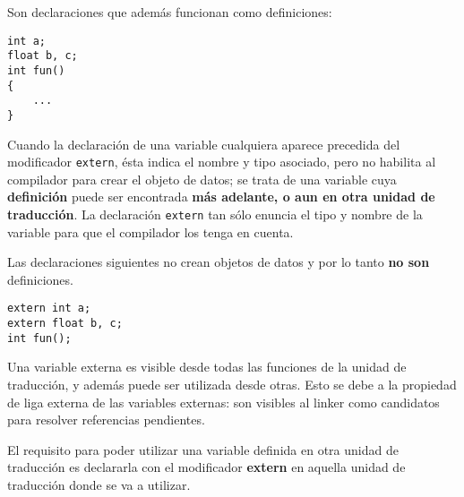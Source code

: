 \begin{ejemplo}
Son declaraciones que además funcionan como definiciones:
\begin{lstlisting}
int a;
float b, c;
int fun() 
{
	...
}
\end{lstlisting}
\end{ejemplo}


Cuando la declaración de una variable cualquiera aparece precedida del modificador \lstinline{extern}, ésta indica el nombre y tipo asociado, pero no habilita al compilador para crear el objeto de datos; se trata de una variable cuya \textbf{definición} puede ser encontrada
\textbf{más adelante, o aun en otra unidad de traducción}. La declaración \lstinline{extern} tan sólo enuncia el tipo y nombre de la variable para que el compilador los tenga en cuenta.

\begin{ejemplo}
Las declaraciones siguientes no crean objetos de datos y por lo tanto \textbf{no son} definiciones.
\begin{lstlisting}
extern int a;
extern float b, c;
int fun();
\end{lstlisting}
\end{ejemplo}

Una variable externa es visible desde todas las funciones de la unidad de traducción, y además puede ser
utilizada desde otras. Esto se debe a la propiedad de liga externa de las variables externas: son visibles
al linker como candidatos para resolver referencias pendientes.

El requisito para poder utilizar una variable definida en otra unidad de traducción es declararla con el
modificador \textbf{extern} en aquella unidad de traducción donde se va a utilizar.


